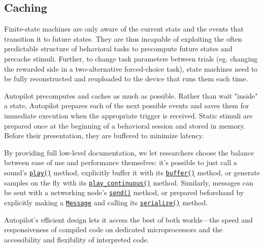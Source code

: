 \subsection{Caching}

Finite-state machines are only aware of the current state and the events that transition it to future states. They are thus incapable of exploiting the often predictable structure of behavioral tasks to precompute future states and precache stimuli. Further, to change task parameters between trials (eg. changing the rewarded side in a two-alternative forced-choice task), state machines need to be fully reconstructed and reuploaded to the device that runs them each time.

Autopilot precomputes and caches as much as possible. Rather than wait "inside" a state, Autopilot prepares each of the next possible events and saves them for immediate execution when the appropriate trigger is received. Static stimuli are prepared once at the beginning of a behavioral session and stored in memory. Before their presentation, they are buffered to minimize latency.

By providing full low-level documentation, we let researchers choose the balance between ease of use and performance themselves: it's possible to just call a sound's \texttt{\href{https://docs.auto-pi-lot.com/en/latest/stim/sound/base.html\#autopilot.stim.sound.base.Jack_Sound.play}{play()}} method, explicitly buffer it with its \texttt{\href{https://docs.auto-pi-lot.com/en/latest/stim/sound/base.html\#autopilot.stim.sound.base.Jack_Sound.buffer}{buffer()}} method, or generate samples on the fly with its \texttt{\href{https://docs.auto-pi-lot.com/en/latest/stim/sound/base.html\#autopilot.stim.sound.base.Jack_Sound.play_continuous}{play\_continuous()}} method. Similarly, messages can be sent with a networking node's \texttt{\href{https://docs.auto-pi-lot.com/en/latest/networking/node.html\#autopilot.networking.node.Net_Node.send}{send()}} method, or prepared beforehand by explicitly making a \texttt{\href{https://docs.auto-pi-lot.com/en/latest/networking/message.html\#autopilot.networking.message.Message}{Message}} and calling its \texttt{\href{https://docs.auto-pi-lot.com/en/latest/networking/message.html\#autopilot.networking.message.Message.serialize}{serialize()}} method.

\vspace{16pt}

Autopilot's efficient design lets it access the best of both worlds---the speed and responsiveness of compiled code on dedicated microprocessors and the accessibility and flexibility of interpreted code.
